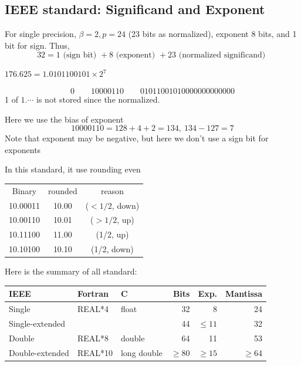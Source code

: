 \subsection{IEEE standard: Significand and Exponent}

For single precision, $\beta = 2, p = 24$ (23 bits as normalized), exponent 8 bits, and 1 bit for sign. Thus, \[
    32 = 1 \text{ (sign bit) } + 8 \text{ (exponent) } + 23 \text{ (normalized significand) }
\] 

\begin{eg}
    $176.625 = 1.0101100101 \times 2^7$
\end{eg}
\[
    0 \qquad 10000110 \qquad 01011001010000000000000
\]
1 of $1.\cdots$ is not stored since the normalized.

\begin{note}
    Here we use the bias of exponent \[
        10000110 = 128 + 4 + 2 = 134,\ 134 - 127 = 7
    \]
    Note that exponent may be negative, but here we don't use a sign bit for exponents
\end{note}

In this standard, it use rounding even
\begin{center}
    \begin{tabular}{ccc}
        Binary & rounded & reason \\
        10.00011 & 10.00 & ($< 1/2$, down)\\
        10.00110 & 10.01 & ($> 1/2$, up)\\
        10.11100 & 11.00 & (1/2, up) \\
        10.10100 & 10.10 & (1/2, down) \\
    \end{tabular}
\end{center}

Here is the summary of all standard:

\begin{center}\small
\begin{tabular}{@{}lllrrr@{}}
    IEEE & Fortran & C & Bits & Exp. &
    Mantissa \\ \hline
    Single & REAL*4 & float & 32 & 8 & 24 \\
    Single-extended & &&44 & $\leq 11$ & 32 \\
    Double & REAL*8 & double& 64 & 11& 53 \\
    Double-extended & REAL*10& long double & 
    $\geq$80 & $\geq 15$ & $\geq$64 
\end{tabular}
\end{center}

